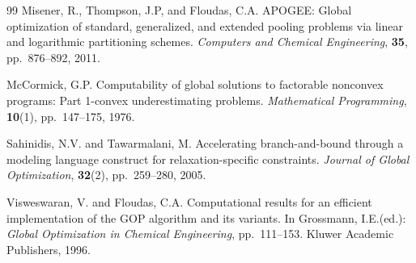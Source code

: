 \documentclass[smallcondensed]{svjour3}
\begin{document}
\begin{thebibliography}{99}
Misener, R., Thompson, J.P, and Floudas, C.A.
\newblock APOGEE: Global optimization of standard, generalized, and extended pooling
problems via linear and logarithmic partitioning schemes.
\newblock \emph{Computers and Chemical Engineering},
\newblock \textbf{35}, pp.\ 876--892, 2011.

McCormick, G.P.
\newblock Computability of global solutions to factorable nonconvex programs: Part 1-convex underestimating problems.
\newblock \emph{Mathematical Programming},
\newblock \textbf{10}(1), pp.\ 147--175, 1976.

Sahinidis, N.V. and Tawarmalani, M.
\newblock Accelerating branch-and-bound through a modeling language construct for relaxation-specific constraints.
\newblock \emph{Journal of Global Optimization},
\newblock \textbf{32}(2), pp.\ 259--280, 2005.

Visweswaran, V. and Floudas, C.A.
\newblock Computational results for an efficient implementation of the GOP algorithm and its variants.
\newblock In Grossmann, I.E.(ed.): \emph{Global Optimization in Chemical Engineering},
\newblock pp.\ 111–153. Kluwer Academic Publishers, 1996.

\end{thebibliography}
\end{document}
